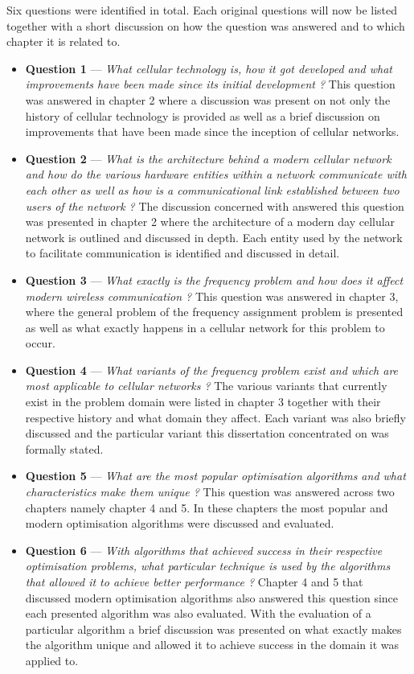 Six questions were identified in total. Each original questions will now be listed together with a short discussion on how the question was answered and to which chapter it is related to.
\begin{itemize}
\item \textbf{Question 1} --- \emph{What cellular technology is, how it got developed and what improvements have been made since its initial development ?} This question was answered in chapter 2 where a discussion was present on not only the history of cellular technology is provided as well as a brief discussion on improvements that have been made since the inception of cellular networks.
\item \textbf{Question 2} --- \emph{What is the architecture behind a modern cellular network and how do the various hardware entities within a network communicate with each other as well as how is a communicational link established between two users of the network ?}  The discussion concerned with answered this question was presented in chapter 2 where the architecture of a modern day cellular network is outlined and discussed in depth. Each entity used by the network to facilitate communication is identified and discussed in detail.
\item \textbf{Question 3} --- \emph{What exactly is the frequency problem and how does it affect modern wireless communication ? } This question was answered in chapter 3, where the general problem of the frequency assignment problem is presented as well as what exactly happens in a cellular network for this problem to occur.
\item \textbf{Question 4} --- \emph{What variants of the frequency problem exist and which are most applicable to cellular networks ?} The various variants that currently exist in the problem domain were listed in chapter 3 together with their respective history and what domain they affect. Each variant was also briefly discussed and the particular variant this dissertation concentrated on was formally stated. 
\item \textbf{Question 5} --- \emph{What are the most popular optimisation algorithms and what characteristics make them unique ?} This question was answered across two chapters namely chapter 4 and 5. In these chapters the most popular and modern optimisation algorithms were discussed and evaluated.
\item \textbf{Question 6} --- \emph{With algorithms that achieved success in their respective optimisation problems, what particular technique is used by the algorithms that allowed it to achieve better performance ?} Chapter 4 and 5 that discussed modern optimisation algorithms also answered this question since each presented algorithm was also evaluated. With the evaluation of a particular algorithm a brief discussion was presented on what exactly makes the algorithm unique and allowed it to achieve success in the domain it was applied to.
\end{itemize}

